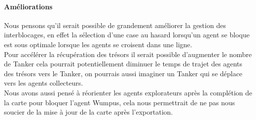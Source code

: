\documentclass[10pt]{article}
\newcommand\tab[1][0.65cm]{\hspace*{#1}}
\begin{document}
\paragraph{Améliorations}  
Nous pensons qu'il serait possible de grandement améliorer la gestion des interblocages, en effet la sélection d'une case au hasard lorsqu'un agent se bloque est sous optimale lorsque les agents se croisent dans une ligne.\\
\tab Pour accélérer la récupération des trésors il serait possible d'augmenter le nombre de Tanker cela pourrait potentiellement diminuer le temps de trajet des agents des trésors vers le Tanker, on pourrais aussi imaginer un Tanker qui se déplace vers les agents collecteurs.\\
\tab Nous avons aussi pensé à réorienter les agents explorateurs après la complétion de la carte pour bloquer l'agent Wumpus, cela nous permettrait de ne pas nous soucier de la mise à jour de la carte après l'exportation.\\ 


	
\end{document}
